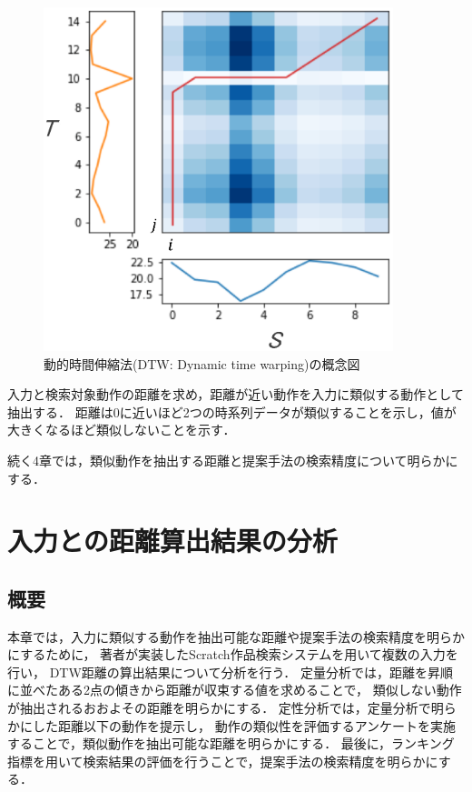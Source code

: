 \documentclass[11pt]{jreport}
\begin{document}
\begin{figure}[H]
    \centering
    \includegraphics[height=10cm]{dtw.eps}
    \caption{動的時間伸縮法(DTW: Dynamic time warping)の概念図}
    \label{dtw}
\end{figure}

入力と検索対象動作の距離を求め，距離が近い動作を入力に類似する動作として抽出する．
距離は0に近いほど2つの時系列データが類似することを示し，値が大きくなるほど類似しないことを示す．

続く4章では，類似動作を抽出する距離と提案手法の検索精度について明らかにする．


\chapter{入力との距離算出結果の分析}
\label{analysys}

\section{概要}
本章では，入力に類似する動作を抽出可能な距離や提案手法の検索精度を明らかにするために，
著者が実装したScratch作品検索システムを用いて複数の入力を行い，
DTW距離の算出結果について分析を行う．
定量分析では，距離を昇順に並べたある2点の傾きから距離が収束する値を求めることで，
類似しない動作が抽出されるおおよその距離を明らかにする．
定性分析では，定量分析で明らかにした距離以下の動作を提示し，
動作の類似性を評価するアンケートを実施することで，類似動作を抽出可能な距離を明らかにする．
最後に，ランキング指標を用いて検索結果の評価を行うことで，提案手法の検索精度を明らかにする．
\end{document}
